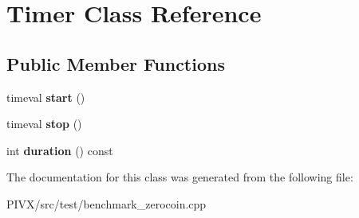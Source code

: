 \hypertarget{class_timer}{}\section{Timer Class Reference}
\label{class_timer}
\subsection*{Public Member Functions}
\begin{DoxyCompactItemize}
\item 
\mbox{\label{class_timer_adcc2a315e6a05332a9f6eeef3fad706b}} 
timeval {\bfseries start} ()
\item 
\mbox{\label{class_timer_a2e08b7392107f224dc5bbc8e1dcfa124}} 
timeval {\bfseries stop} ()
\item 
\mbox{\label{class_timer_aed895ee071f6a2cde1fc25e57159bb5f}} 
int {\bfseries duration} () const
\end{DoxyCompactItemize}


The documentation for this class was generated from the following file\+:\begin{DoxyCompactItemize}
\item 
P\+I\+V\+X/src/test/benchmark\+\_\+zerocoin.\+cpp\end{DoxyCompactItemize}
